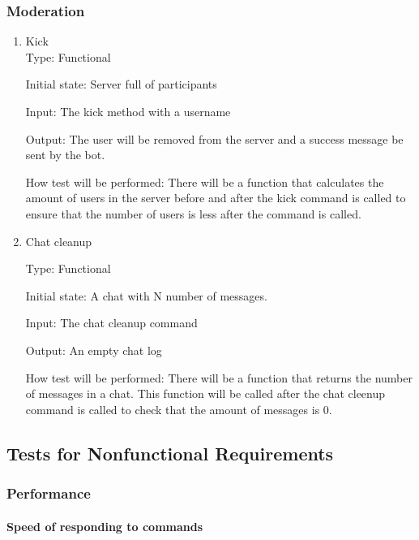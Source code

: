\documentclass[12pt, titlepage]{article}
\begin{document}
\subsubsection{Moderation}
\begin{enumerate}
\item{Kick\\}
Type: Functional

Initial state: Server full of participants

Input: The kick method with a username

Output: The user will be removed from the server and a success message be sent by the bot.

How test will be performed: There will be a function that calculates the amount of users in the server before and after the kick command is called to ensure that the number of users is less after the command is called.

\item{Chat cleanup\\}

Type: Functional

Initial state: A chat with N number of messages.

Input: The chat cleanup command

Output: An empty chat log

How test will be performed: There will be a function that returns the number of messages in a chat. This function will be called after the chat cleenup command is called to check that the amount of messages is 0.


\end{enumerate}



\subsection{Tests for Nonfunctional Requirements}

\subsubsection{Performance}
		
\paragraph{Speed of responding to commands}
\end{document}
